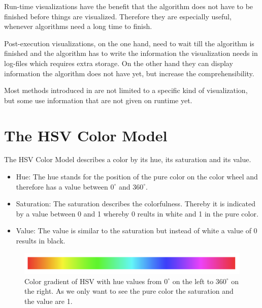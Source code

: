 \documentclass
[
    paper = a4,
    pagesize,
    12 pt,
    oneside,                       %
    open = right,
    DIV = calc,
    BCOR = 0 mm,                   %
    bibtotoc
]
{scrbook}
\begin{document}
Run-time visualizations have the benefit that the algorithm does not have to be finished before things are visualized.
Therefore they are especially useful, whenever algorithms need a long time to finish.

Post-execution visualizations, on the one hand, need to wait till the algorithm is finished and the algorithm has to write the information the visualization needs in log-files which requires extra storage.
On the other hand they can display information the algorithm does not have yet, but increase the comprehensibility.

Most methods introduced in  are not limited to a specific kind of visualization, but some use information that are not given on runtime yet.



\section{The HSV Color Model}

The HSV Color Model describes a color by its hue, its saturation and its value.
\begin{itemize}
  \item Hue: The hue stands for the position of the pure color on the color wheel and therefore has a value between $0^\circ$ and $360^\circ$.
  \item Saturation: The saturation describes the colorfulness. Thereby it is indicated by a value between 0 and 1 whereby 0 reults in white and 1 in the pure color.
  \item Value: The value is similar to the saturation but instead of white a value of 0 results in black.
\end{itemize}

\begin{figure}[H]
  \begin{minipage}{\textwidth}
    \includegraphics[width=\textwidth]{Images/hsv.png}
    \caption[]{Color gradient of HSV with hue values from $0^\circ$ on the left to $360^\circ$ on the right. As we only want to see the pure color the saturation and the value are 1.}
    \label{fig:hsv}
    \end{minipage}
\end{figure}
\end{document}
